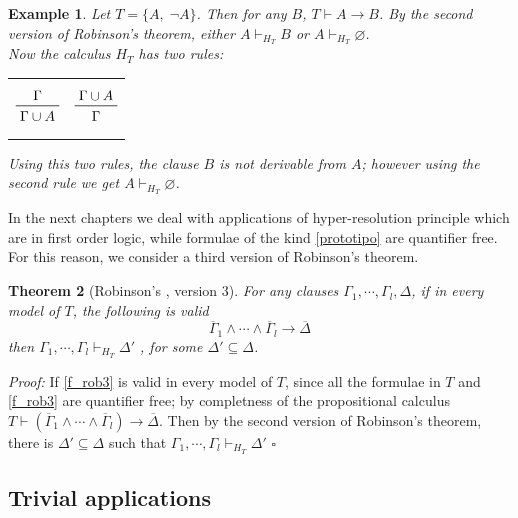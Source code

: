 \documentclass[a4paper,12pt,oneside]{book}
\newtheorem{theorem}{Theorem}[chapter]
\newtheorem{example}[theorem]{Example}
\newcommand*{\QED}{\hfill\ensuremath{\square}}
\let\emptyset\varnothing
\let\e\wedge
\begin{document}
\begin{example} Let $T=\{ A ,\; \neg A \}$. Then for any $B$, $T\vdash A\rightarrow B$.
By the second version of Robinson's theorem, either $ A \vdash_{H_T} B $ or  $ A \vdash_{H_T} \emptyset$. \\Now the calculus $H_T$ has two rules:

\begin{center}
\begin{tabular}{cc}

$$\prftree{\Gamma }  {\Gamma\cup A} 
$$
& \hspace{10mm}
$$\prftree{\Gamma \cup A }  {\Gamma }
$$
\end{tabular}
\end{center}
Using this two rules, the clause $B$ is not derivable from $A$; however using the second rule we get $ A \vdash_{H_T} \emptyset$.
\end{example}
 

In the next chapters we deal with applications of hyper-resolution principle which are in first order logic, while formulae of the kind \ref{prototipo} are quantifier free. For this reason, we consider a third version of Robinson's theorem. 

\begin{theorem}[{Robinson's , version 3}] \label{Robinson3}
For any clauses $\Gamma_1, \cdots ,\Gamma_l , \Delta$, if in every model of $T$, the following is valid 
\begin{equation}\label{f_rob3}
\overline{\Gamma}_1\e\cdots\e\overline{\Gamma}_l \rightarrow \overline{\Delta}
\end{equation}
then  $\Gamma_1, \cdots ,\Gamma_l \vdash_{H_T} \Delta'$ , for some $\Delta' \subseteq \Delta$.
\end{theorem}

\textit{Proof:} If \ref{f_rob3} is valid in every model of $T$, since all the formulae in $T$ and \ref{f_rob3} are quantifier free; by completness of the propositional calculus $T\vdash (\overline{\Gamma}_1\e\cdots\e\overline{\Gamma}_l )\rightarrow\overline{\Delta}$. Then by the second version of Robinson's theorem, there is $\Delta' \subseteq \Delta$ such that $\Gamma_1, \cdots ,\Gamma_l \vdash_{H_T} \Delta'$ \QED

\newpage
\subsection*{Trivial applications}
	
\end{document}
